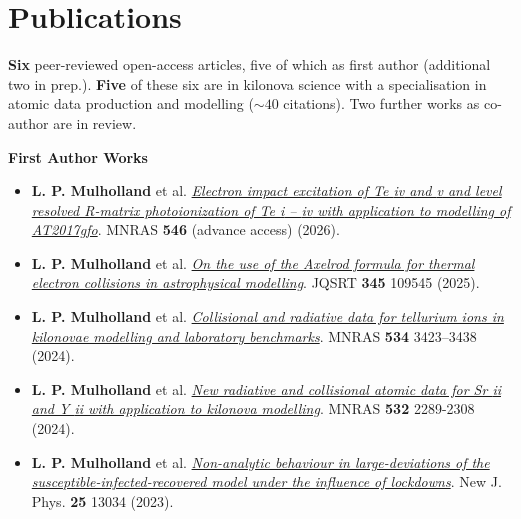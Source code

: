 \documentclass[a4paper,11pt]{article}
\begin{document}
\section{Publications}

\textbf{Six} peer-reviewed open-access articles, five of which as first author (additional two in prep.). \textbf{Five} of these six are in kilonova science with a specialisation in atomic data production and modelling (\textbf{$\sim 40$} citations). Two further works as co-author are in review.

\textbf{First Author Works}
\begin{itemize}[label=,leftmargin=0.1cm]
    	\item \textbf{L. P. Mulholland} et al. \href{https://doi.org/10.1093/mnras/stag237}{\emph{Electron impact excitation of Te {\sc iv} and {\sc v} and level resolved R-matrix photoionization of Te {\sc i} – {\sc iv} with application to modelling of AT2017gfo}}. MNRAS \textbf{546} (advance access) (2026).
        \item \textbf{L. P. Mulholland} et al. \href{https://doi.org/10.1016/j.jqsrt.2025.109545}{\emph{On the use of the Axelrod formula for thermal electron collisions in astrophysical modelling}}. JQSRT \textbf{345} 109545 (2025).
    	\item \textbf{L. P. Mulholland} et al. \href{https://doi.org/10.1093/mnras/stae2331}{\emph{Collisional and radiative data for tellurium ions in kilonovae modelling and laboratory benchmarks}}. MNRAS \textbf{534} 3423–3438 (2024).
	\item \textbf{L. P. Mulholland} et al. \href{https://academic.oup.com/mnras/article/532/2/2289/7702447}{\emph{New radiative and collisional atomic data for Sr {\sc ii} and Y {\sc ii} with application to kilonova modelling}}. MNRAS \textbf{532} 2289-2308 (2024).
    
	\item \textbf{L. P. Mulholland} et al. \href{https://iopscience.iop.org/article/10.1088/1367-2630/ad0991/meta}{\emph{Non-analytic behaviour in large-deviations of the susceptible-infected-recovered model under the influence of lockdowns}}. New J. Phys. \textbf{25} 13034 (2023).

\end{itemize}
\end{document}
